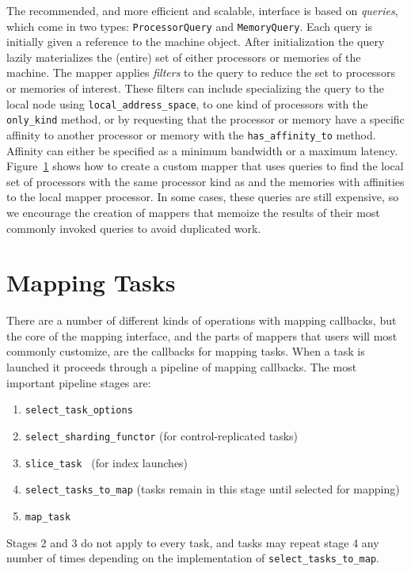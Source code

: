 The recommended, and more efficient and scalable, interface is based
on {\em queries}, which come in two types: {\tt ProcessorQuery} and 
{\tt MemoryQuery}. Each query is initially given a reference to the machine
object. After initialization the query lazily materializes the (entire) set of 
either processors or memories of the machine.
The mapper applies {\em filters} to the query to reduce the
set to processors or memories of interest.  These filters can include specializing
the query to the local node using {\tt local\_address\_space}, to one kind of processors with the {\tt only\_kind} method, or by
requesting that the processor or memory have a specific affinity to another
processor or memory with the {\tt has\_affinity\_to} method. Affinity can either be
specified as a minimum bandwidth or a maximum latency. Figure~\ref{fig:mapper_machine}
shows how to create a custom mapper that uses queries to find the local set of 
processors with the same processor kind as and the memories with affinities to the local
mapper processor. In some cases, these queries are still expensive, so we
encourage the creation of mappers that memoize the results of their most 
commonly invoked queries to avoid duplicated work.

\begin{figure}

\caption{}
\label{fig:mapper_machine}
\end{figure}


\section{Mapping Tasks}
\label{sec:mapping:tasks}

There are a number of different kinds of operations with mapping callbacks, but the core of the mapping interface, and the parts
of mappers that users will most commonly customize, are the callbacks for mapping tasks.
When a task is launched it proceeds through a pipeline of mapping callbacks.  The most important pipeline stages are:
\begin{enumerate}
\item {\tt select\_task\_options }
\item {\tt select\_sharding\_functor} (for control-replicated tasks)
\item {\tt slice\_task }  (for index launches)
\item {\tt select\_tasks\_to\_map} (tasks remain in this stage until selected for mapping)
\item {\tt map\_task}
\end{enumerate}
Stages 2 and 3 do not apply to every task, and tasks may repeat stage 4 any number of times depending on the implementation of {\tt select\_tasks\_to\_map}.

